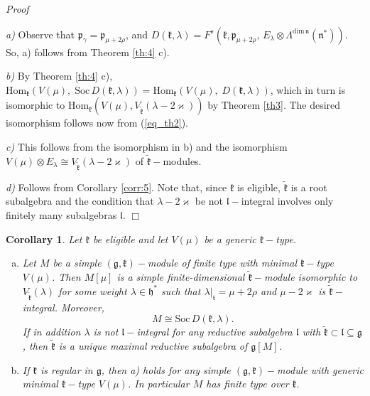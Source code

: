 \documentclass[default]{./styles/svmult}
\newtheorem{cor}[theo]{Corollary}
\renewenvironment{proof}{ \emph{Proof}}{$\Box$}
\newcommand{\Soc}{\mathrm{Soc}}
\newcommand{\Hom}{\mathrm{Hom}}
\renewcommand{\gg}{\mathfrak{g}}
\newcommand{\hh}{\mathfrak{h}}
\newcommand{\kk}{\mathfrak{k}}
\renewcommand{\ll}{\mathfrak{l}}
\newcommand{\nn}{\mathfrak{n}}
\newcommand{\pp}{\mathfrak{p}}
\renewcommand{\tt}{\mathfrak{t}}
\begin{document}
\begin{proof}

    \textit{a)} Observe that $\pp_{\gamma} = \pp_{\mu+2\rho}$, and $D(\kk,\lambda)=F^s(\kk,\pp_{\mu+2\rho},\,E_{\lambda} \otimes \Lambda^{\mathrm{dim}\,\nn}(\nn^*))$. So, a) follows from Theorem \ref{th:4} c).

\vspace{0.3cm}

 \textit{b)} By Theorem \ref{th:4} c), $\Hom_{\kk}(V(\mu),\;\Soc\,D(\kk,\lambda)) = \Hom_{\kk}(V(\mu),\;D(\kk,\lambda))$, which in turn is isomorphic to $\Hom_{\kk}(V(\mu),V_{\tilde{\kk}}(\lambda-2\varkappa))$ by Theorem \ref{th3}. The desired isomorphism follows now from (\ref{eq_th2}).

\vspace{0.3cm}

 \textit{c)} This follows from the isomorphism in b) and the isomorphism $V(\mu) \otimes E_{\lambda} \cong V_{\tilde{\kk}}(\lambda-2\varkappa)$ of $\tilde{\kk}-$modules.
 
 \vspace{0.3cm}
 
 \textit{d)} Follows from Corollary \ref{corr:5}. Note that, since $\kk$ is eligible, $\tilde{\kk}$ is a root subalgebra and the condition that $\lambda - 2\varkappa$ be not $\ll-$integral involves only finitely many subalgebras $\ll$. 
\end{proof}

\begin{cor}\label{corr:9}
 Let $\kk$ be eligible and let $V(\mu)$ be a generic $\kk-$type.
      \begin{enumerate}[a)]
       \item Let $M$ be a simple $(\gg,\kk)-$module of finite type with minimal $\kk-$type $V(\mu)$. Then $M[\mu]$ is a simple finite-dimensional $\tilde{\kk}-$module isomorphic to $V_{\tilde{\kk}}(\lambda)$ for some weight $\lambda \in \hh^*$ such that $\lambda|_{\tt} = \mu + 2\rho$ and $\mu - 2\varkappa$ is $\tilde{\kk}-$integral. Moreover,$$M \cong \Soc\,D(\kk,\lambda).$$
       If in addition $\lambda$ is not $\ll-$integral for any reductive subalgebra $\ll$ with $\tilde{\kk} \subset \ll \subseteq \gg$, then $\tilde{\kk}$ is a unique maximal reductive subalgebra of $\gg[M]$.
       
	\item If $\kk$ is regular in $\gg$, then a) holds for any simple $(\gg,\kk)-$module with generic minimal $\kk-$type $V(\mu)$. In particular $M$ has finite type over $\kk$.
      \end{enumerate}
\end{cor}
\end{document}
